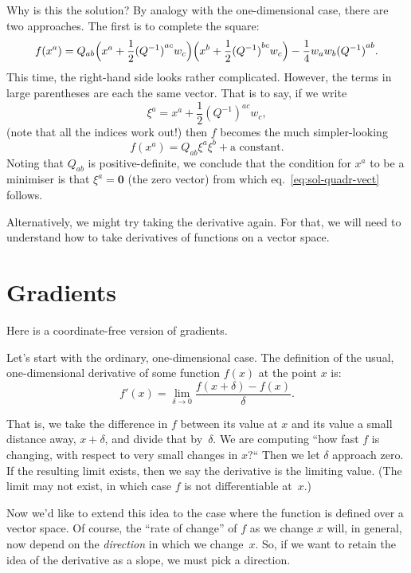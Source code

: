 \documentclass[10pt, a4paper]{article}
\newcommand{\bzero}{\mathbold{0}} %
\begin{document}
Why is this the solution? By analogy with the one-dimensional case,
there are two approaches. The first is to complete the square:
\begin{equation*}
  f(x^a) = Q_{ab}\Bigl(x^a +
  \frac{1}{2}{(Q^{-1})}^{ac}w_c\Bigr)\Bigl(x^b +
  \frac{1}{2}{(Q^{-1})}^{bc}w_c\Bigr) - \frac{1}{4}w_aw_b{(Q^{-1})}^{ab}.
\end{equation*}
This time, the right-hand side looks rather complicated. However, the
terms in large parentheses are each the same vector. That is to say,
if we write
\begin{equation*}
  \xi^a = x^a +  \frac{1}{2}{(Q^{-1})}^{ac}w_c,
\end{equation*}
(note that all the indices work out!) then $f$ becomes the much
simpler-looking
\begin{equation*}
  f(x^a) = Q_{ab}\xi^a\xi^b + \text{a constant}.
\end{equation*}
Noting that $Q_{ab}$ is positive-definite, we conclude that the
condition for $x^a$ to be a minimiser is that $\xi^a = \bzero$ (the zero
vector) from which eq.~\ref{eq:sol-quadr-vect} follows.

Alternatively, we might try taking the derivative again. For that, we
will need to understand how to take derivatives of functions on a
vector space.

\section*{Gradients}

Here is a coordinate-free version of gradients.

Let's start with the ordinary, one-dimensional case. The definition of
the usual, one-dimensional derivative of some function $f(x)$ at the
point $x$ is:
\begin{equation*}
  f'(x) = \lim_{\delta\to0} \frac{f(x+\delta) - f(x)}{\delta}.
\label{eq:ordinary-derivative}
\end{equation*}

That is, we take the difference in $f$ between its value at $x$ and
its value a small distance away, $x+\delta$, and divide that
by~$\delta$. We are computing “how fast $f$ is changing, with respect to
very small changes in $x$?“ Then we let $\delta$ approach zero. If the
resulting limit exists, then we say the derivative is the limiting
value. (The limit may not exist, in which case $f$ is not
differentiable at~$x$.)

Now we'd like to extend this idea to the case where the function is
defined over a vector space. Of course, the “rate of change” of $f$ as
we change $x$ will, in general, now depend on the \emph{direction} in
which we change~$x$. So, if we want to retain the idea of the
derivative as a slope, we must pick a direction.
\end{document}
